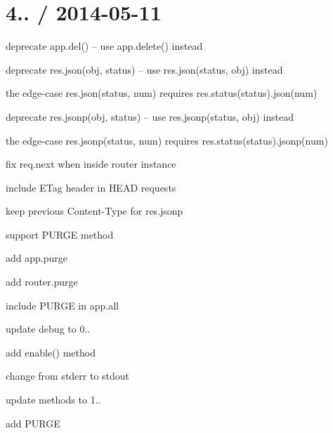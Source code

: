 \section*{4.. / 2014-\/05-\/11 }


\begin{DoxyItemize}
\item deprecate {\ttfamily app.\+del()} -- use {\ttfamily app.\+delete()} instead
\item deprecate {\ttfamily res.\+json(obj, status)} -- use {\ttfamily res.\+json(status, obj)} instead
\begin{DoxyItemize}
\item the edge-\/case {\ttfamily res.\+json(status, num)} requires {\ttfamily res.\+status(status).json(num)}
\end{DoxyItemize}
\item deprecate {\ttfamily res.\+jsonp(obj, status)} -- use {\ttfamily res.\+jsonp(status, obj)} instead
\begin{DoxyItemize}
\item the edge-\/case {\ttfamily res.\+jsonp(status, num)} requires {\ttfamily res.\+status(status).jsonp(num)}
\end{DoxyItemize}
\item fix {\ttfamily req.\+next} when inside router instance
\item include {\ttfamily E\+Tag} header in {\ttfamily H\+E\+A\+D} requests
\item keep previous {\ttfamily Content-\/\+Type} for {\ttfamily res.\+jsonp}
\item support P\+U\+R\+G\+E method
\begin{DoxyItemize}
\item add {\ttfamily app.\+purge}
\item add {\ttfamily router.\+purge}
\item include P\+U\+R\+G\+E in {\ttfamily app.\+all}
\end{DoxyItemize}
\item update debug to 0..
\begin{DoxyItemize}
\item add {\ttfamily enable()} method
\item change from stderr to stdout
\end{DoxyItemize}
\item update methods to 1..
\begin{DoxyItemize}
\item add P\+U\+R\+G\+E
\end{DoxyItemize}
\end{DoxyItemize}


